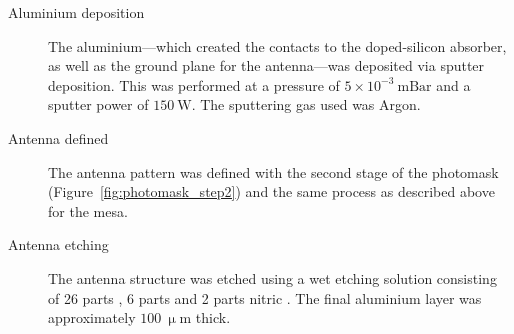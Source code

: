 \begin{description}
\item[Aluminium deposition] The aluminium---which created the contacts to the doped-silicon absorber, as well as the ground plane for the antenna---was deposited via sputter deposition. This was performed at a pressure of $5 \times 10^{-3}~\mathrm{mBar}$ and a sputter power of $150~\mathrm{W}$. The sputtering gas used was Argon.
\item[Antenna defined] The antenna pattern was defined with the second stage of the photomask (Figure~\ref{fig:photomask_step2}) and the same process as described above for the mesa.
\item[Antenna etching] The antenna structure was etched using a wet etching solution consisting of 26 parts , 6 parts  and 2 parts nitric . The final aluminium layer was approximately $100~\mathrm{\upmu m}$ thick.
\end{description}
